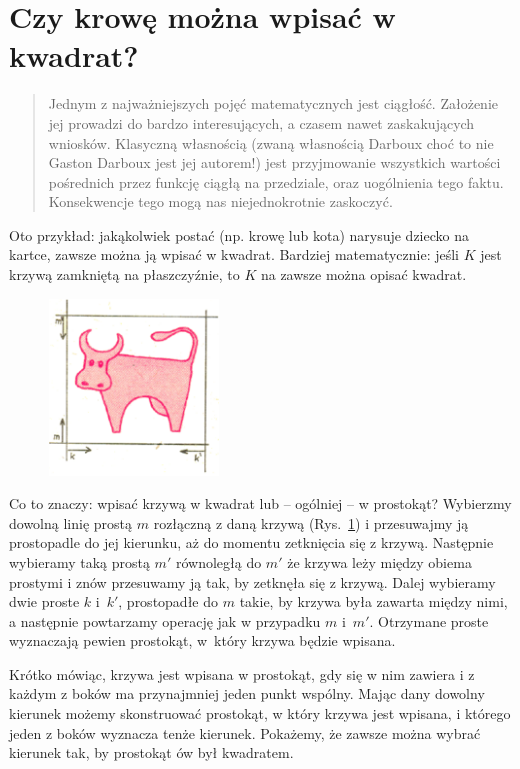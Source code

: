 \documentclass[a4paper,12pt]{article}
\begin{document}
\pagestyle{empty}

\section*{Czy krowę można wpisać w kwadrat?}

\begin{abstract}
Jednym z najważniejszych pojęć matematycznych jest ciągłość.
Założenie jej prowadzi do bardzo interesujących,
a czasem nawet zaskakujących wniosków.
Klasyczną własnością (zwaną własnością Darboux choć to
nie Gaston Darboux jest jej autorem!)
jest przyjmowanie wszystkich wartości pośrednich przez
funkcję ciągłą na przedziale, oraz uogólnienia tego faktu.
Konsekwencje tego mogą nas niejednokrotnie zaskoczyć.
\end{abstract}

Oto przykład: jakąkolwiek postać (np. krowę lub kota)
narysuje dziecko na kartce, zawsze można ją wpisać w kwadrat.
Bardziej matematycznie: jeśli $K$ jest krzywą zamkniętą 
na płaszczyźnie, to $K$ na zawsze można opisać kwadrat.

\begin{figure}
\includegraphics[width=4.5cm]{krowa-1}
\vspace{-20pt}
\label{krowa}
\end{figure}

Co to znaczy: wpisać krzywą w kwadrat lub – ogólniej – w prostokąt?
Wybierzmy dowolną linię prostą $m$ rozłączną z daną krzywą (Rys.~\ref{krowa}) 
i przesuwajmy ją prostopadle do jej kierunku,
aż do momentu zetknięcia się z krzywą.
Następnie wybieramy taką prostą $m'$ równoległą do $m'$   
że krzywa leży między obiema prostymi i znów przesuwamy ją tak,
by zetknęła się z krzywą. Dalej wybieramy dwie proste $k$
i~$k'$, prostopadłe do $m$ takie, by krzywa była zawarta między nimi,
a następnie powtarzamy operację jak w przypadku
$m$ i~$m'$. Otrzymane proste wyznaczają pewien prostokąt, 
w~który krzywa będzie wpisana.

Krótko mówiąc, krzywa jest wpisana w prostokąt,
gdy się w nim zawiera i z każdym z boków ma przynajmniej
jeden punkt wspólny. Mając dany dowolny kierunek
możemy skonstruować prostokąt, w który krzywa
jest wpisana, i którego jeden z boków wyznacza 
tenże kierunek. Pokażemy, że zawsze można wybrać
kierunek tak, by prostokąt ów był kwadratem. 
\end{document}
